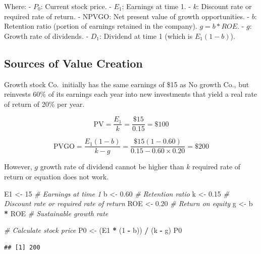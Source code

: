 \documentclass[
]{book}
\newenvironment{Shaded}{\begin{snugshade}}{\end{snugshade}}
\newcommand{\CommentTok}[1]{\textcolor[rgb]{0.56,0.35,0.01}{\textit{#1}}}
\newcommand{\DecValTok}[1]{\textcolor[rgb]{0.00,0.00,0.81}{#1}}
\newcommand{\FloatTok}[1]{\textcolor[rgb]{0.00,0.00,0.81}{#1}}
\newcommand{\NormalTok}[1]{#1}
\newcommand{\OtherTok}[1]{\textcolor[rgb]{0.56,0.35,0.01}{#1}}
\newcommand{\SpecialCharTok}[1]{\textcolor[rgb]{0.81,0.36,0.00}{\textbf{#1}}}
\begin{document}
Where: - \(P_0\): Current stock price. - \(E_1\): Earnings at time 1. -
\(k\): Discount rate or required rate of return. - \(\text{NPVGO}\): Net
present value of growth opportunities. - \(b\): Retention ratio (portion
of earnings retained in the company). \(g = b*ROE\). - \(g\): Growth
rate of dividends. - \(D_1\): Dividend at time 1 (which is
\(E_1 (1 - b)\)).

\hypertarget{sources-of-value-creation}{%
\subsection{Sources of Value Creation}\label{sources-of-value-creation}}

Growth stock Co.~initially has the same earnings of \$15 as No growth
Co., but reinvests 60\% of its earnings each year into new investments
that yield a real rate of return of 20\% per year.

\[
  \text{PV} = \frac{E_1}{k} = \frac{\$15}{0.15} = \$100
  \]

\[
  \text{PVGO} = \frac{E_1 (1 - b)}{k - g} = \frac{\$15 (1 - 0.60)}{0.15 - 0.60 \times 0.20} = \$200
  \]

However, \(g\) growth rate of dividend cannot be higher than \(k\)
required rate of return or equation does not work.

\begin{Shaded}
\begin{Highlighting}[]
\NormalTok{E1 }\OtherTok{\textless{}{-}} \DecValTok{15}              \CommentTok{\# Earnings at time 1}
\NormalTok{b }\OtherTok{\textless{}{-}} \FloatTok{0.60}             \CommentTok{\# Retention ratio}
\NormalTok{k }\OtherTok{\textless{}{-}} \FloatTok{0.15}             \CommentTok{\# Discount rate or required rate of return}
\NormalTok{ROE }\OtherTok{\textless{}{-}} \FloatTok{0.20}           \CommentTok{\# Return on equity}
\NormalTok{g }\OtherTok{\textless{}{-}}\NormalTok{ b }\SpecialCharTok{*}\NormalTok{ ROE          }\CommentTok{\# Sustainable growth rate}

\CommentTok{\# Calculate stock price}
\NormalTok{P0 }\OtherTok{\textless{}{-}}\NormalTok{ (E1 }\SpecialCharTok{*}\NormalTok{ (}\DecValTok{1} \SpecialCharTok{{-}}\NormalTok{ b)) }\SpecialCharTok{/}\NormalTok{ (k }\SpecialCharTok{{-}}\NormalTok{ g)}
\NormalTok{P0}
\end{Highlighting}
\end{Shaded}

\begin{verbatim}
## [1] 200
\end{verbatim}
\end{document}
